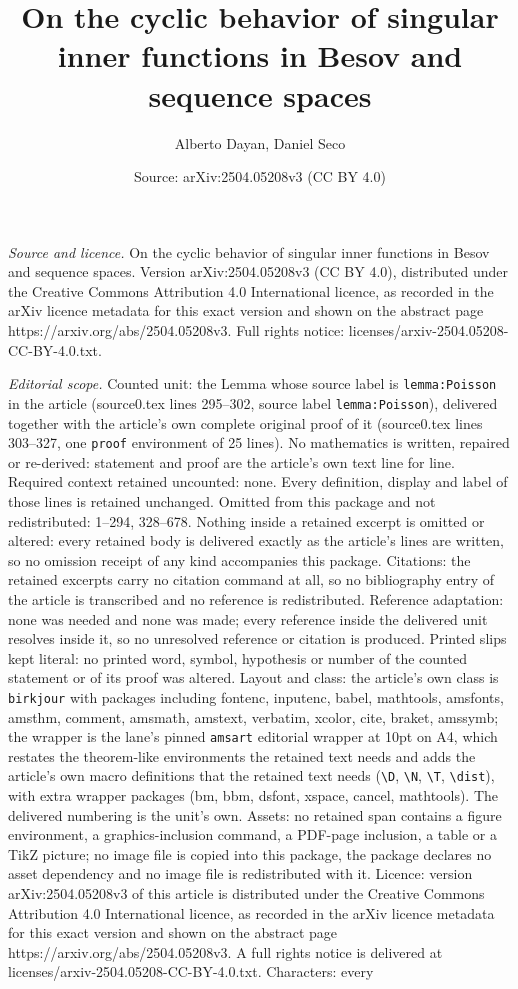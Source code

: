 \documentclass[10pt,a4paper]{amsart}
\title[On the cyclic behavior of singular inner functions in Besov ]{On the cyclic behavior of singular inner functions in Besov and sequence spaces}
\author{Alberto Dayan, Daniel Seco}
\date{Source: arXiv:2504.05208v3 (CC BY 4.0)}
\begin{document}
\maketitle

\noindent\emph{Source and licence.} On the cyclic behavior of singular inner functions in Besov and sequence spaces. Version arXiv:2504.05208v3 (CC BY 4.0), distributed under the Creative Commons Attribution 4.0 International licence, as recorded in the arXiv licence metadata for this exact version and shown on the abstract page https://arxiv.org/abs/2504.05208v3. Full rights notice: licenses/arxiv-2504.05208-CC-BY-4.0.txt.\par\smallskip

\noindent\textit{Editorial scope.} Counted unit: the Lemma whose source label is \texttt{lemma:Poisson} in the article (source0.tex lines 295--302, source label \texttt{lemma:Poisson}), delivered together with the article's own complete original proof of it (source0.tex lines 303--327, one \texttt{proof} environment of 25 lines). No mathematics is written, repaired or re-derived: statement and proof are the article's own text line for line. Required context retained uncounted: none. Every definition, display and label of those lines is retained unchanged. Omitted from this package and not redistributed: 1--294, 328--678. Nothing inside a retained excerpt is omitted or altered: every retained body is delivered exactly as the article's lines are written, so no omission receipt of any kind accompanies this package. Citations: the retained excerpts carry no citation command at all, so no bibliography entry of the article is transcribed and no reference is redistributed. Reference adaptation: none was needed and none was made; every reference inside the delivered unit resolves inside it, so no unresolved reference or citation is produced. Printed slips kept literal: no printed word, symbol, hypothesis or number of the counted statement or of its proof was altered. Layout and class: the article's own class is \texttt{birkjour} with packages including fontenc, inputenc, babel, mathtools, amsfonts, amsthm, comment, amsmath, amstext, verbatim, xcolor, cite, braket, amssymb; the wrapper is the lane's pinned \texttt{amsart} editorial wrapper at 10pt on A4, which restates the theorem-like environments the retained text needs and adds the article's own macro definitions that the retained text needs (\texttt{\textbackslash D}, \texttt{\textbackslash N}, \texttt{\textbackslash T}, \texttt{\textbackslash dist}), with extra wrapper packages (bm, bbm, dsfont, xspace, cancel, mathtools). The delivered numbering is the unit's own. Assets: no retained span contains a figure environment, a graphics-inclusion command, a PDF-page inclusion, a table or a TikZ picture; no image file is copied into this package, the package declares no asset dependency and no image file is redistributed with it. Licence: version arXiv:2504.05208v3 of this article is distributed under the Creative Commons Attribution 4.0 International licence, as recorded in the arXiv licence metadata for this exact version and shown on the abstract page https://arxiv.org/abs/2504.05208v3. A full rights notice is delivered at licenses/arxiv-2504.05208-CC-BY-4.0.txt. Characters: every 
\end{document}
